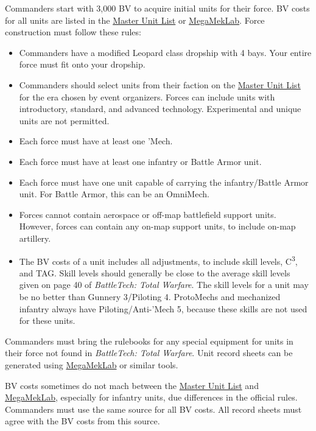 Commanders start with 3,000 BV to acquire initial units for their force.
BV costs for all units are listed in the \href{http://www.masterunitlist.info}{Master Unit List} or \href{https://megamek.org}{MegaMekLab}.
Force construction must follow these rules:

\begin{itemize}

\item Commanders have a modified Leopard class dropship with 4 bays.
Your entire force must fit onto your dropship.

\item Commanders should select units from their faction on the \href{http://www.masterunitlist.info/}{Master Unit List} for the era chosen by event organizers.
Forces can include units with introductory, standard, and advanced technology.
Experimental and unique units are not permitted.

\item Each force must have at least one 'Mech.

\item Each force must have at least one infantry or Battle Armor unit.

\item Each force must have one unit capable of carrying the infantry/Battle Armor unit.
For Battle Armor, this can be an OmniMech.

\item Forces cannot contain aerospace or off-map battlefield support units.
However, forces can contain any on-map support units, to include on-map artillery.

\item The BV costs of a unit includes all adjustments, to include skill levels, C\textsuperscript{3}, and TAG.
Skill levels should generally be close to the average skill levels given on page 40 of \emph{BattleTech: Total Warfare}.
The skill levels for a unit may be no better than Gunnery 3/Piloting 4.
ProtoMechs and mechanized infantry always have Piloting/Anti-'Mech 5, because these skills are not used for these units.

\end{itemize}

Commanders must bring the rulebooks for any special equipment for units in their force not found in \emph{BattleTech: Total Warfare}.
Unit record sheets can be generated using \href{https://megamek.org}{MegaMekLab} or similar tools.

BV costs sometimes do not mach between the \href{http://www.masterunitlist.info}{Master Unit List} and \href{https://megamek.org}{MegaMekLab}, especially for infantry units, due differences in the official rules.
Commanders must use the same source for all BV costs.
All record sheets must agree with the BV costs from this source.

